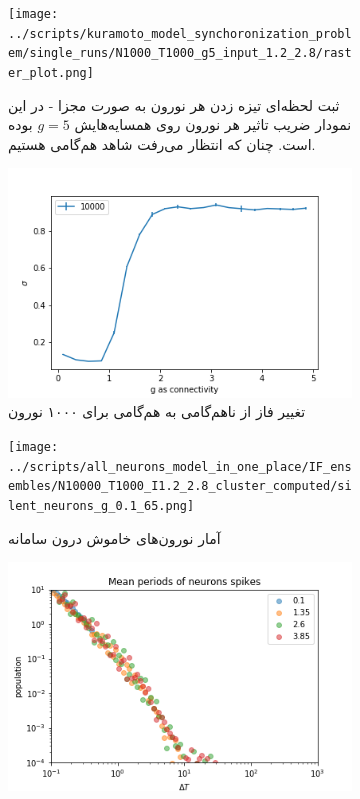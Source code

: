 \begin{figure}
	\begin{subfigure}[b]{0.5\textwidth}
		\centering
		\texttt{[image: ../scripts/kuramoto\_model\_synchoronization\_problem/single\_runs/N1000\_T1000\_g5\_input\_1.2\_2.8/raster\_plot.png]}
		\caption{ثبت لحظه‌ای تیزه زدن هر نورون به صورت مجزا - در این نمودار ضریب تاثیر هر نورون روی همسایه‌هایش $g = 5$ بوده است. چنان که انتظار می‌رفت شاهد هم‌گامی هستیم.}
		\label{fig:rasterplot}
	\end{subfigure}
	\hfill
	\begin{subfigure}[b]{0.5\textwidth}
		\centering
		\includegraphics[width =  \textwidth]{../papers_studies/figs/IF/sigma.png}
		\caption{تغییر فاز از ناهم‌گامی به هم‌گامی برای ۱۰۰۰ نورون}
		\label{fig:if_phase_transition}
	\end{subfigure}
	\hfill
	\begin{subfigure}[b]{0.5\textwidth}
		\centering
		\texttt{[image: ../scripts/all\_neurons\_model\_in\_one\_place/IF\_ensembles/N10000\_T1000\_I1.2\_2.8\_cluster\_computed/silent\_neurons\_g\_0.1\_65.png]}
		\caption{آمار نورون‌های خاموش درون سامانه}
		\label{fig:if_silent_neurons}
	\end{subfigure}
	\hfill
	\begin{subfigure}[b]{0.5\textwidth}
		\centering
		\includegraphics[width = \textwidth]{../papers_studies/figs/IF/mean_spiking_persiods.png}

\end{subfigure}
\end{figure}
